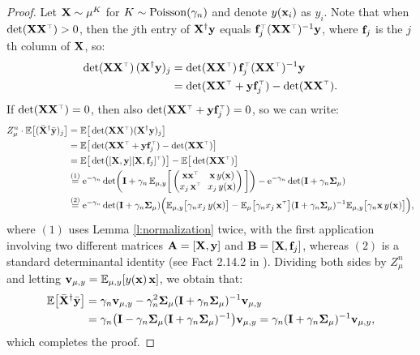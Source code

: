 \documentclass[11pt]{article}
\begin{document}
\begin{proof}
   Let $\mathbf X\sim\mu^K$ for $K\sim{\operatorname{Poisson}}(\gamma_n)$ and denote
   $y(\mathbf x_i)$ as $y_i$.
  Note that when $\det(\X\X^\top)>0$, then
  the $j$th entry of $\mathbf X^\dagger\mathbf y$ equals
  $\f_j^\top(\X\X^\top)^{-1}\y$, where $\mathbf f_j$ is the $j$th
  column of $\mathbf X$, so:
\begin{align*}
  \det(\X\X^\top)\,(\X^\dagger\y)_j
  &= \det(\X\X^\top)\, \f_j^\top(\X\X^\top)^{-1}\y \\
  &=
  \det(\X\X^\top+\y\f_j^\top) - \det(\X\X^\top).
\end{align*}
If $\det(\X\X^\top)=0$, then also
$\det(\X\X^\top+\y\f_j^\top)=0$, so we can write:
\begin{align*}
Z_\mu^n\cdot\E\big[(\Xb^\dagger\ybb)_j\big]
  &=  \E\big[\det(\X\X^\top)(\X^\dagger\y)_j\big] \\
  &= \E\big[\det(\X\X^\top+\y\f_j^\top)-\det(\X\X^\top)\big]  \\
  &=\E\big[\det\!\big([\X,\y][\X,\f_j]^\top\big)\big] - \E\big[\det(\X\X^\top)\big]\\
  &\overset{(1)}{=}\ee^{-\gamma_n}\det\!\bigg(\I +
    \gamma_n\,\E_{\mu,y}\bigg[\begin{pmatrix}\x\x^\top&
      \!\!\x\, y(\x)\\ x_j\,\x^\top&\!\!
      x_j\,y(\x)\end{pmatrix}\bigg]\bigg)
                          -\ee^{-\gamma_n}\det(\I+\gamma_n\Sigmab_\mu)\\
  &\overset{(2)}{=}\ee^{-\gamma_n}\det(\I+\gamma_n\Sigmab_\mu)\Big(\E_{\mu,y}\big[\gamma_n
    x_j\,y(\x)\big] - \E_{\mu}\big[\gamma_n
    x_j\,\x^\top\big](\I+\gamma_n\Sigmab_\mu)^{-1}\E_{\mu,y}\big[\gamma_n\x\,
    y(\x)\big]\Big),
\end{align*}
where $(1)$ uses Lemma \ref{l:normalization} twice, with the first
application involving two different matrices $\mathbf A=[\mathbf X,\mathbf y]$ and
$\mathbf B=[\mathbf X,\mathbf f_j]$, whereas $(2)$ is a standard determinantal identity
(see Fact 2.14.2 in \cite{matrix-mathematics}).
  Dividing both sides by $Z_\mu^n$ and letting $\mathbf v_{\mu,y}=\mathbb E_{\mu,y}[y(\mathbf x)\,\mathbf x]$, we obtain that:
  \begin{align*}
    \mathbb E\big[{\bar{\mathbf X}}^\dagger\bar{\mathbf y}\big]
    &= \gamma_n\mathbf v_{\mu,y} - \gamma_n^2\mathbf{\Sigma}_\mu(\mathbf I+\gamma_n\mathbf{\Sigma}_\mu)^{-1}\mathbf v_{\mu,y}\\
&=\gamma_n\big(\mathbf I - \gamma_n\mathbf{\Sigma}_\mu (\mathbf I+\gamma_n\mathbf{\Sigma}_\mu)^{-1}\big)\mathbf v_{\mu,y}
=\gamma_n(\mathbf I+\gamma_n\mathbf{\Sigma}_\mu)^{-1}\mathbf v_{\mu,y},
  \end{align*}
  which completes the proof.
\end{proof}
\end{document}
